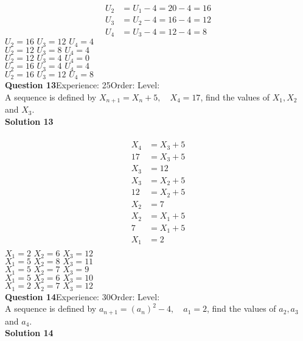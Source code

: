 \documentclass{article}
\begin{document}
\\[-10pt]\begin{align*}
U_2&=U_1-4=20-4=16\\[2pt]
U_3&=U_2-4=16-4=12\\[2pt]
U_4&=U_3-4=12-4=8
\end{align*}
$U_2=16 \,\, U_3=12 \,\, U_4=4$\\
$U_2=12 \,\, U_3=8 \,\, U_4=4$\\
$U_2=12 \,\, U_3=4 \,\, U_4=0$\\
$U_2=16 \,\, U_3=4 \,\, U_4=4$\\
$U_2=16 \,\, U_3=12 \,\, U_4=8$\\
\noindent\textbf{Question 13}\hspace{20pt}Experience: 25\hspace{20pt}Order: \hspace{20pt}Level: \\[2pt]
A sequence is defined by $X_{n+1}=X_n+5, \quad X_4=17$, find the values of $X_1,X_2$ and $X_3$.\\[4pt]
\noindent\textbf{Solution 13}\\[2pt]
\\[-10pt]\begin{align*}
X_4&=X_3+5\\[2pt]
17&=X_3+5\\[2pt]
X_3&=12\\[12pt]
X_3&=X_2+5\\[2pt]
12&=X_2+5\\[2pt]
X_2&=7\\[12pt]
X_2&=X_1+5\\[2pt]
7&=X_1+5\\[2pt]
X_1&=2\\[12pt]
\end{align*}
$X_1=2 \,\, X_2=6 \,\, X_3=12$\\
$X_1=5 \,\, X_2=8 \,\, X_3=11$\\
$X_1=5 \,\, X_2=7 \,\, X_3=9$\\
$X_1=5 \,\, X_2=6 \,\, X_3=10$\\
$X_1=2 \,\, X_2=7 \,\, X_3=12$\\
\noindent\textbf{Question 14}\hspace{20pt}Experience: 30\hspace{20pt}Order: \hspace{20pt}Level: \\[2pt]
A sequence is defined by $a_{n+1}=(a_n)^2-4, \quad a_1=2$, find the values of $a_2,a_3$ and $a_4$.\\[4pt]
\noindent\textbf{Solution 14}\\[2pt]
\end{document}
